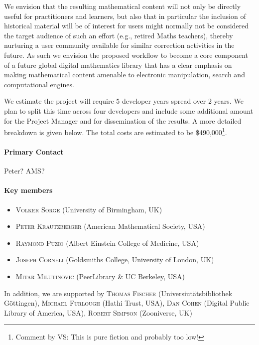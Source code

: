 \documentclass{article}
\def\comment#1#2{\typeout{Comment!}\footnote{Comment by #1: #2}}
\begin{document}
We envision that the resulting mathematical content will not only be directly
useful for practitioners and learners, but also that in particular the inclusion
of historical material will be of interest for users might normally not be
considered the target audience of such an effort (e.g., retired Maths teachers),
thereby nurturing a user community available for similar correction activities
in the future.  As such we envision the proposed workflow to become a core
component of a future global digital mathematics library that has a clear
emphasis on making mathematical content amenable to electronic manipulation,
search and computational engines.

We estimate the project will require 5 developer years spread over 2 years. We
plan to split this time across four developers and include some additional
amount for the Project Manager and for dissemination of the results. A more
detailed breakdown is given below. The total costs are estimated to be
\$490,000\comment{VS}{This is pure fiction and probably too low!}.

\paragraph{Primary Contact}\label{primary-contact}

Peter? AMS?

\paragraph{Key members}\label{key-members}

\begin{itemize}
\item \textsc{Volker Sorge} (University of Birmingham, UK)
\item \textsc{Peter Krautzberger} (American Mathematical Society, USA)
\item \textsc{Raymond Puzio} (Albert Einstein College of Medicine, USA) 
\item \textsc{Joseph Corneli} (Goldsmiths College, University of London, UK)
\item \textsc{Mitar Milutinovic} (PeerLibrary \& UC Berkeley, USA) 
\end{itemize}

In addition, we are supported by \textsc{Thomas Fischer} (Universiut{\"a}tsbibliothek
G{\"o}ttingen), 
 \textsc{Michael Furlough} (Hathi Trust, USA),
 \textsc{Dan Cohen} (Digital Public Library of America, USA),
 \textsc{Robert Simpson} (Zooniverse, UK)
\end{document}
